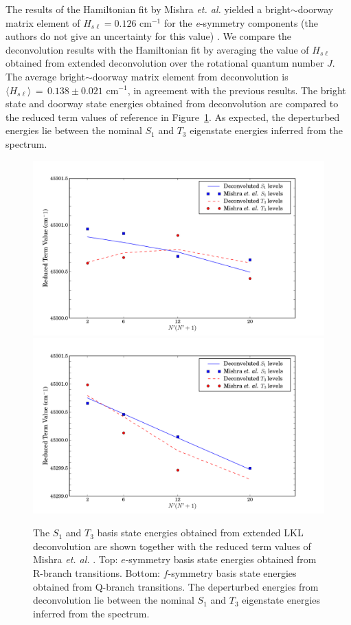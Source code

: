 The results of the Hamiltonian fit by Mishra \emph{et. al.} yielded a
bright$\sim$doorway matrix element of $H_{s\ell} = 0.126$ cm$^{-1}$
for the \emph{e}-symmetry components (the authors do not give an
uncertainty for this value) \cite{mishra04}.  We compare the
deconvolution results with the Hamiltonian fit by averaging the value
of $H_{s\ell}$ obtained from extended deconvolution over the
rotational quantum number $J$.  The average bright$\sim$doorway matrix
element from deconvolution is $\langle H_{s\ell} \rangle \, = \, 0.138
\pm 0.021$ cm$^{-1}$, in agreement with the previous results.  The
bright state and doorway state energies obtained from deconvolution
are compared to the reduced term values of reference \cite{mishra04}
in Figure~\ref{fig:ryan-comparison}.  As expected, the deperturbed
energies lie between the nominal $S_1$ and $T_3$ eigenstate
energies inferred from the spectrum.

\begin{figure}
  \caption{The $S_1$ and $T_3$ basis state energies obtained from
    extended LKL deconvolution are shown together with the reduced
    term values of Mishra \emph{et. al.} \cite{mishra04}.  Top:
    $e$-symmetry basis state energies obtained from R-branch
    transitions.  Bottom: $f$-symmetry basis state energies obtained
    from Q-branch transitions. The deperturbed energies from
    deconvolution lie between the nominal $S_1$ and $T_3$ eigenstate
    energies inferred from the spectrum.}
  \label{fig:ryan-comparison}
  \centering
  \includegraphics[width=6.5in]{ryan-comparison-r.png}
  \includegraphics[width=6.5in]{ryan-comparison-q.png}
\end{figure}

